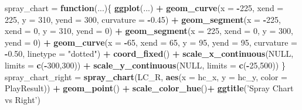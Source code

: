 \documentclass[]{article}
\newenvironment{Shaded}{\begin{snugshade}}{\end{snugshade}}
\newcommand{\KeywordTok}[1]{\textcolor[rgb]{0.13,0.29,0.53}{\textbf{#1}}}
\newcommand{\DataTypeTok}[1]{\textcolor[rgb]{0.13,0.29,0.53}{#1}}
\newcommand{\DecValTok}[1]{\textcolor[rgb]{0.00,0.00,0.81}{#1}}
\newcommand{\FloatTok}[1]{\textcolor[rgb]{0.00,0.00,0.81}{#1}}
\newcommand{\StringTok}[1]{\textcolor[rgb]{0.31,0.60,0.02}{#1}}
\newcommand{\OtherTok}[1]{\textcolor[rgb]{0.56,0.35,0.01}{#1}}
\newcommand{\ControlFlowTok}[1]{\textcolor[rgb]{0.13,0.29,0.53}{\textbf{#1}}}
\newcommand{\OperatorTok}[1]{\textcolor[rgb]{0.81,0.36,0.00}{\textbf{#1}}}
\newcommand{\NormalTok}[1]{#1}
\begin{document}
\begin{Shaded}
\begin{Highlighting}[]
\NormalTok{spray_chart =}\StringTok{ }\ControlFlowTok{function}\NormalTok{(...)\{}
  \KeywordTok{ggplot}\NormalTok{(...) }\OperatorTok{+}\StringTok{ }
\StringTok{    }\KeywordTok{geom_curve}\NormalTok{(}\DataTypeTok{x =} \OperatorTok{-}\DecValTok{225}\NormalTok{, }\DataTypeTok{xend =} \DecValTok{225}\NormalTok{, }\DataTypeTok{y =} \DecValTok{310}\NormalTok{, }\DataTypeTok{yend =} \DecValTok{300}\NormalTok{, }\DataTypeTok{curvature =} \OperatorTok{-}\FloatTok{0.45}\NormalTok{) }\OperatorTok{+}\StringTok{ }
\StringTok{    }\KeywordTok{geom_segment}\NormalTok{(}\DataTypeTok{x =} \OperatorTok{-}\DecValTok{225}\NormalTok{, }\DataTypeTok{xend =} \DecValTok{0}\NormalTok{, }\DataTypeTok{y =} \DecValTok{310}\NormalTok{, }\DataTypeTok{yend =} \DecValTok{0}\NormalTok{) }\OperatorTok{+}
\StringTok{    }\KeywordTok{geom_segment}\NormalTok{(}\DataTypeTok{x =}  \DecValTok{225}\NormalTok{, }\DataTypeTok{xend =} \DecValTok{0}\NormalTok{, }\DataTypeTok{y =} \DecValTok{300}\NormalTok{, }\DataTypeTok{yend =} \DecValTok{0}\NormalTok{) }\OperatorTok{+}\StringTok{ }
\StringTok{    }\KeywordTok{geom_curve}\NormalTok{(}\DataTypeTok{x =} \OperatorTok{-}\DecValTok{65}\NormalTok{, }\DataTypeTok{xend =} \DecValTok{65}\NormalTok{, }\DataTypeTok{y =} \DecValTok{95}\NormalTok{, }\DataTypeTok{yend =} \DecValTok{95}\NormalTok{, }\DataTypeTok{curvature =} \OperatorTok{-}\FloatTok{0.50}\NormalTok{, }\DataTypeTok{linetype =} \StringTok{"dotted"}\NormalTok{) }\OperatorTok{+}
\StringTok{    }\KeywordTok{coord_fixed}\NormalTok{() }\OperatorTok{+}
\StringTok{    }\KeywordTok{scale_x_continuous}\NormalTok{(}\OtherTok{NULL}\NormalTok{, }\DataTypeTok{limits =} \KeywordTok{c}\NormalTok{(}\OperatorTok{-}\DecValTok{300}\NormalTok{,}\DecValTok{300}\NormalTok{)) }\OperatorTok{+}\StringTok{ }
\StringTok{    }\KeywordTok{scale_y_continuous}\NormalTok{(}\OtherTok{NULL}\NormalTok{, }\DataTypeTok{limits =} \KeywordTok{c}\NormalTok{(}\OperatorTok{-}\DecValTok{25}\NormalTok{,}\DecValTok{500}\NormalTok{))}
\NormalTok{\}}
\NormalTok{spray_chart_right =}\StringTok{ }\KeywordTok{spray_chart}\NormalTok{(LC_R, }\KeywordTok{aes}\NormalTok{(}\DataTypeTok{x =}\NormalTok{ hc_x, }\DataTypeTok{y =}\NormalTok{ hc_y, }\DataTypeTok{color =}\NormalTok{ PlayResult)) }\OperatorTok{+}
\StringTok{  }\KeywordTok{geom_point}\NormalTok{() }\OperatorTok{+}
\StringTok{  }\KeywordTok{scale_color_hue}\NormalTok{()}\OperatorTok{+}
\StringTok{  }\KeywordTok{ggtitle}\NormalTok{(}\StringTok{'Spray Chart vs Right'}\NormalTok{)}


\end{Highlighting}
\end{Shaded}
\end{document}
